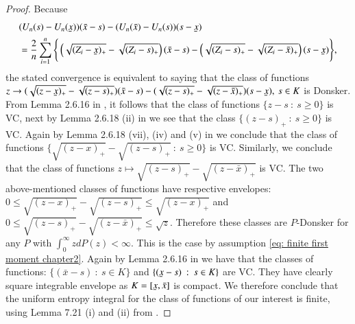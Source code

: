 \begin{proof}
Because
\begin{align*}
    &(U_n(s)- U_n(\ubar{x})) (\bar{x} - s) - (U_n(\bar{x}) - U_n(s))(s - \ubar{x}) \\
    &= \frac{2}{n} \sum_{i=1}^n \Bigg\{\left( \sqrt{(Z_i-\ubar{x})_{+}} - \sqrt{(Z_i-s)_{+}}\right)(\bar{x}-s) - \left( \sqrt{(Z_i-s)_{+}} - \sqrt{(Z_i-\bar{x})_{+}}\right)(s-\ubar{x})  \Bigg\},
\end{align*}
the stated convergence is equivalent to saying that the class of functions $z \rightarrow ( \sqrt{(z-\ubar{x})_{+}} - \sqrt{(z-s)_{+}})(\bar{x}-s) - ( \sqrt{(z-s)_{+}} - \sqrt{(z-\bar{x})_{+}})(s-\ubar{x}), \: s \in K$ is Donsker. From Lemma 2.6.16 in \cite{5}, it follows that the class of functions $\{ z- s \: : \: s \geq 0 \}$ is VC, next by Lemma 2.6.18 (ii) in \cite{5} we see that the class $\{ (z -s)_{+} \: : \: s \geq 0 \}$ is VC. Again by Lemma 2.6.18 (vii), (iv) and (v) in \cite{5} we conclude that the class of functions $\{ \sqrt{(z-x)_{+}} - \sqrt{(z-s)_{+}} \: : \: s \geq 0 \}$ is VC. Similarly, we conclude that the class of functions 
$z \mapsto \sqrt{(z-s)_{+}} - \sqrt{(z-\bar{x})_{+}}$ is VC. The two above-mentioned classes of functions have respective envelopes: $0 \leq \sqrt{(z-x)_{+}} - \sqrt{(z-s)_{+}} \leq \sqrt{(z-x)_{+}}$ and $0 \leq \sqrt{(z-s)_{+}} - \sqrt{(z-\bar{x})_{+}} \leq \sqrt{z}$. Therefore these classes are $P$-Donsker for any $P$ with $\int_{0}^{\infty} z dP(z) < \infty$. This is the case by assumption \eqref{eq: finite first moment chapter2}. Again by Lemma 2.6.16 in \cite{5} we have that the classes of functions: $\{(\bar{x}-s) \: : \: s \in K \}$ and $\{(\ubar{x}-s) \: : \: s \in K\}$ are VC. They have clearly square integrable envelope as $K = [\ubar{x},\bar{x}]$ is compact. 
We therefore conclude that the uniform entropy integral for the class of functions of our interest is finite, using Lemma 7.21 (i) and (ii) from \cite{22}.


\end{proof}
